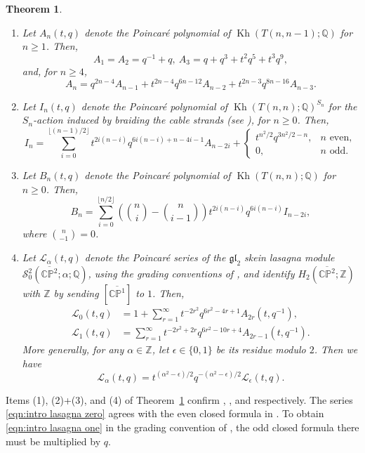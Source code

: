 \documentclass[reqno]{amsart}
\newtheorem{thm}{Theorem}[section]
\theoremstyle{definition}
\theoremstyle{remark}
\newcommand{\Z}{\mathbb Z}
\newcommand{\QQ}{\mathbb{Q}}
\newcommand{\CP}{\mathbb{CP}}
\DeclareMathOperator{\Kh}{Kh}
\begin{document}
\begin{thm}\label{thm:finite torus links and lasagna}
\begin{enumerate}
\item Let $A_n(t,q)$ denote the Poincar\'e polynomial of $\Kh(T(n,n-1);\QQ)$ for $n\ge1$. Then,
\[
A_1=A_2=q^{-1}+q,\ A_3=q+q^3+t^2q^5+t^3q^9,
\]
and, for $n\ge4$,
\[
A_n=q^{2n-4}A_{n-1}+t^{2n-4}q^{6n-12}A_{n-2}
+t^{2n-3}q^{8n-16}A_{n-3}.
\]
\item Let $I_n(t,q)$ denote the Poincar\'e polynomial of $\Kh(T(n,n);\QQ)^{S_n}$ for the $S_n$-action induced by braiding the cable strands (see \cite{grigsby2018annular}), for $n\ge0$. Then,
\[
I_n=\sum_{i=0}^{\lfloor(n-1)/2\rfloor}
 t^{2i(n-i)}q^{6i(n-i)+n-4i-1}A_{n-2i}+\begin{cases}
 t^{n^2/2}q^{3n^2/2-n},&n\text{ even},\\
 0,&n\text{ odd}.
\end{cases}
\]
\item Let $B_n(t,q)$ denote the Poincar\'e polynomial of $\Kh(T(n,n);\QQ)$ for $n\ge0$. Then,
\[
B_n=\sum_{i=0}^{\lfloor n/2\rfloor}
\left(\binom{n}{i}-\binom{n}{i-1}\right)
 t^{2i(n-i)}q^{6i(n-i)}I_{n-2i},
\]
where $\binom{n}{-1}=0$.
\item Let $\mathcal L_\alpha(t,q)$ denote the Poincar\'e series of the $\mathfrak{gl}_2$ skein lasagna module $\mathcal S_0^2(\overline{\CP^2};\alpha;\QQ)$, using the grading conventions of \cite{ren2024khovanov}, and identify $H_2(\overline{\CP^2};\Z)$ with $\mathbb Z$ by sending $[\overline{\CP^1}]$ to $1$. Then,
\begin{align}
\mathcal L_0(t,q)
&=1+\sum_{r=1}^{\infty}t^{-2r^2}q^{6r^2-4r+1}A_{2r}(t,q^{-1}),
\label{eqn:intro lasagna zero}\\
\mathcal L_1(t,q)
&=\sum_{r=1}^{\infty}t^{-2r^2+2r}q^{6r^2-10r+4}A_{2r-1}(t,q^{-1}).
\label{eqn:intro lasagna one}
\end{align}
More generally, for any $\alpha\in\Z$, let $\epsilon\in\{0,1\}$ be its residue modulo $2$. Then we have
\[
\mathcal L_\alpha(t,q)
=t^{(\alpha^2-\epsilon)/2}q^{-(\alpha^2-\epsilon)/2}\mathcal L_\epsilon(t,q).
\]
\end{enumerate}
\end{thm}


Items (1), (2)+(3), and (4) of Theorem~\ref{thm:finite torus links and lasagna} confirm \cite[Conjecture 1.8]{gorsky2013stable}, \cite[Conjecture 6.1]{ren2024lee}, and \cite[Conjecture 6.15]{ren2024khovanov} respectively. The series \eqref{eqn:intro lasagna zero} agrees with the even closed formula in \cite[Conjecture~4.3]{ritter2025computing}. To obtain \eqref{eqn:intro lasagna one} in the grading convention of \cite{ren2024khovanov}, the odd closed formula there must be multiplied by $q$.
\end{document}
